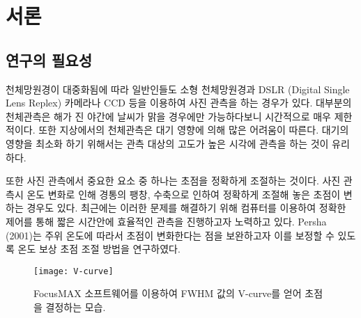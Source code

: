 

\section{서론}
\subsection{연구의 필요성}

천체망원경이 대중화됨에 따라 일반인들도 소형 천체망원경과 DSLR (Digital Single Lens Replex) 카메라나 CCD 등을 이용하여 사진 관측을 하는 경우가 있다. 대부분의 천체관측은 해가 진 야간에 날씨가 맑을 경우에만 가능하다보니 시간적으로 매우 제한적이다. 또한 지상에서의 천체관측은 대기 영향에 의해 많은 어려움이 따른다. 대기의 영향을 최소화 하기 위해서는 관측 대상의 고도가 높은 시각에 관측을 하는 것이 유리하다. 

또한 사진 관측에서 중요한 요소 중 하나는 초점을 정확하게 조절하는 것이다. 사진 관측시 온도 변화로 인해 경통의 팽창, 수축으로 인하여 정확하게 조절해 놓은 초점이 변하는 경우도 있다. 최근에는 이러한 문제를 해결하기 위해 컴퓨터를 이용하여 정확한 제어를 통해 짧은 시간안에 효율적인 관측을 진행하고자 노력하고 있다. Persha (2001)는 주위 온도에 따라서 초점이 변화한다는 점을 보완하고자 이를 보정할 수 있도록 온도 보상 초점 조절 방법을 연구하였다.\cite{persha2001temperature} 



\begin{figure}[h]
	\begin{center}
		\texttt{[image: V-curve]}
	\end{center}
	\caption{FocusMAX 소프트웨어를 이용하여 FWHM 값의 V-curve를 얻어 초점을 결정하는 모습. \cite{weber2001fast}}
	\label{V-curve}
\end{figure}

